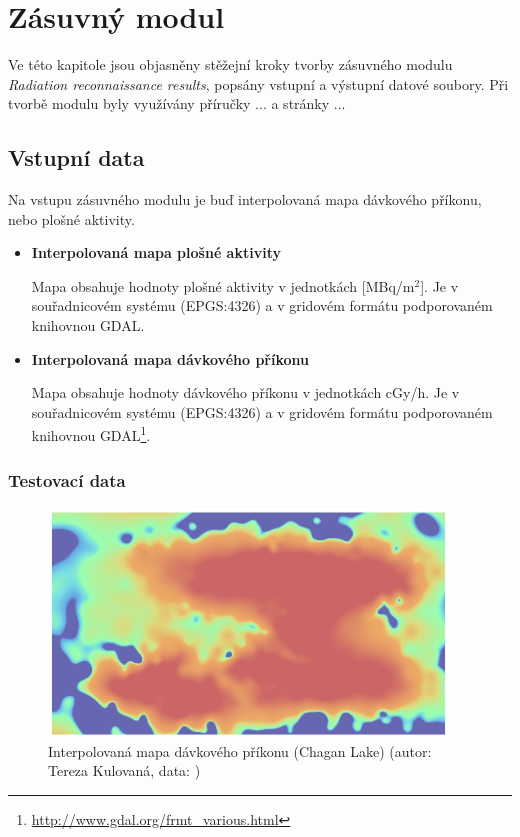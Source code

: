 \chapter{Zásuvný modul}
\label{4-plugin}

Ve této kapitole jsou objasněny stěžejní kroky tvorby zásuvného modulu
\textit{Radiation reconnaissance results}, popsány vstupní a výstupní
datové soubory. Při tvorbě modulu byly využívány příručky ... a
stránky ...\cite{diveIntoPython}

\section{Vstupní data}

Na vstupu zásuvného modulu je buď interpolovaná mapa dávkového
příkonu, nebo plošné aktivity.

\begin{itemize}
\item \textbf{Interpolovaná mapa plošné aktivity}

  Mapa obsahuje hodnoty plošné aktivity v jednotkách
  {[}MBq/m$^2${]}. Je v souřadnicovém systému  (EPGS:4326)
  a v gridovém formátu podporovaném knihovnou GDAL.

\item \textbf{Interpolovaná mapa dávkového příkonu}

  Mapa obsahuje hodnoty dávkového příkonu v jednotkách cGy/h. Je v
  souřadnicovém systému  (EPGS:4326) a v gridovém formátu
  podporovaném knihovnou
  GDAL\footnote{\url{http://www.gdal.org/frmt_various.html}}.
	
\end{itemize}

\subsection{Testovací data}

\begin{figure}[H]
    \centering
      \includegraphics[width=300pt]{./pictures/chagan_spline.jpg}
      \caption[Interpolovaná mapa]{Interpolovaná mapa dávkového příkonu (Chagan Lake) (autor: Tereza Kulovaná, data: )}
      \label{fig:spline}
\end{figure}

